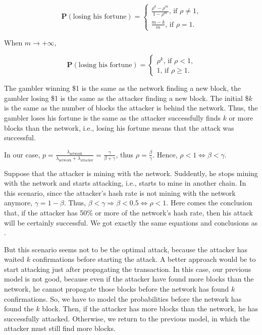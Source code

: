 $$
\mathbf{P}(\text{losing his fortune}) =
\begin{cases}
	\frac{\rho^k - \rho^m}{1-\rho^m} \text{, if $\rho \ne 1$,} \\
	\frac{m-k}{m} \text{, if $\rho = 1$.}
\end{cases}
$$

When $m \rightarrow +\infty$,

$$
\mathbf{P}(\text{losing his fortune}) =
\begin{cases}
	\rho^k \text{, if $\rho < 1$,} \\
	1 \text{, if $\rho \geq 1$.}
\end{cases}
$$


The gambler winning \$1 is the same as the network finding a new block, the gambler losing \$1 is the same as the attacker finding a new block. The initial \$$k$ is the same as the number of blocks the attacker is behind the network. Thus, the gambler loses his fortune is the same as the attacker successfully finds $k$ or more blocks than the network, i.e., losing his fortune means that the attack was successful.

In our case, $p = \frac{\lambda_{\text{network}}}{\lambda_{\text{network}} + \lambda_{\text{attacker}}} = \frac{\gamma}{\beta + \gamma}$, thus $\rho = \frac{\beta}{\gamma}$. Hence, $\rho < 1 \Leftrightarrow \beta < \gamma$.

Suppose that the attacker is mining with the network. Suddently, he stops mining with the network and starts attacking, i.e., starts to mine in another chain. In this scenario, since the attacker's hash rate is not mining with the network anymore, $\gamma = 1 - \beta$. Thus, $\beta < \gamma \Rightarrow \beta < 0.5 \Leftrightarrow \rho < 1$. Here comes the conclusion that, if the attacker has 50\% or more of the network's hash rate, then his attack will be certainly successful. We got exactly the same equations and conclusions as \cite{nakamoto2008bitcoin}.

But this scenario seems not to be the optimal attack, because the attacker has waited $k$ confirmations before starting the attack. A better approach would be to start attacking just after propagating the transaction. In this case, our previous model is not good, because even if the attacker have found more blocks than the network, he cannot propagate those blocks before the network has found $k$ confirmations. So, we have to model the probabilities before the network has found the $k$ block. Then, if the attacker has more blocks than the network, he has successfully attacked. Otherwise, we return to the previous model, in which the attacker must still find more blocks.

